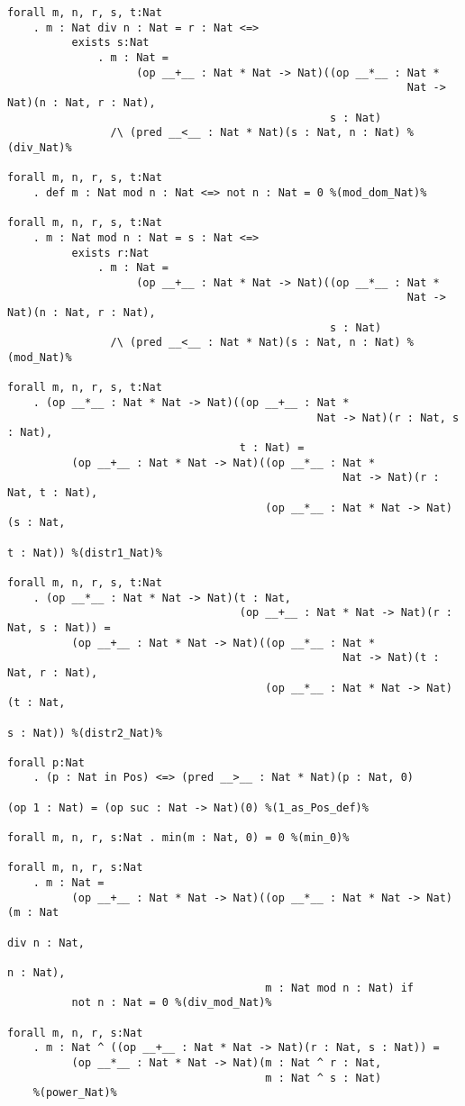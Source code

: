 \documentclass[11pt,a4paper]{article}
\begin{document}
\begin{verbatim}
forall m, n, r, s, t:Nat
    . m : Nat div n : Nat = r : Nat <=>
          exists s:Nat
              . m : Nat =
                    (op __+__ : Nat * Nat -> Nat)((op __*__ : Nat *
                                                              Nat -> Nat)(n : Nat, r : Nat),
                                                  s : Nat)
                /\ (pred __<__ : Nat * Nat)(s : Nat, n : Nat) %(div_Nat)%

forall m, n, r, s, t:Nat
    . def m : Nat mod n : Nat <=> not n : Nat = 0 %(mod_dom_Nat)%

forall m, n, r, s, t:Nat
    . m : Nat mod n : Nat = s : Nat <=>
          exists r:Nat
              . m : Nat =
                    (op __+__ : Nat * Nat -> Nat)((op __*__ : Nat *
                                                              Nat -> Nat)(n : Nat, r : Nat),
                                                  s : Nat)
                /\ (pred __<__ : Nat * Nat)(s : Nat, n : Nat) %(mod_Nat)%

forall m, n, r, s, t:Nat
    . (op __*__ : Nat * Nat -> Nat)((op __+__ : Nat *
                                                Nat -> Nat)(r : Nat, s : Nat),
                                    t : Nat) =
          (op __+__ : Nat * Nat -> Nat)((op __*__ : Nat *
                                                    Nat -> Nat)(r : Nat, t : Nat),
                                        (op __*__ : Nat * Nat -> Nat)(s : Nat,
                                                                      t : Nat)) %(distr1_Nat)%

forall m, n, r, s, t:Nat
    . (op __*__ : Nat * Nat -> Nat)(t : Nat,
                                    (op __+__ : Nat * Nat -> Nat)(r : Nat, s : Nat)) =
          (op __+__ : Nat * Nat -> Nat)((op __*__ : Nat *
                                                    Nat -> Nat)(t : Nat, r : Nat),
                                        (op __*__ : Nat * Nat -> Nat)(t : Nat,
                                                                      s : Nat)) %(distr2_Nat)%

forall p:Nat
    . (p : Nat in Pos) <=> (pred __>__ : Nat * Nat)(p : Nat, 0)

(op 1 : Nat) = (op suc : Nat -> Nat)(0) %(1_as_Pos_def)%

forall m, n, r, s:Nat . min(m : Nat, 0) = 0 %(min_0)%

forall m, n, r, s:Nat
    . m : Nat =
          (op __+__ : Nat * Nat -> Nat)((op __*__ : Nat * Nat -> Nat)(m : Nat
                                                                      div n : Nat,
                                                                      n : Nat),
                                        m : Nat mod n : Nat) if
          not n : Nat = 0 %(div_mod_Nat)%

forall m, n, r, s:Nat
    . m : Nat ^ ((op __+__ : Nat * Nat -> Nat)(r : Nat, s : Nat)) =
          (op __*__ : Nat * Nat -> Nat)(m : Nat ^ r : Nat,
                                        m : Nat ^ s : Nat)
    %(power_Nat)%
\end{verbatim}
\end{document}
